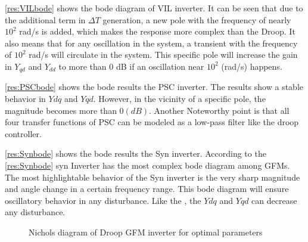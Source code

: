 \ref{res:VILbode} shows the bode diagram of \gls{VIL} inverter. It can be seen that due to the additional term in $\Delta T$ generation, a new pole with the frequency of nearly $10^2$ rad/s is added, which makes the response more complex than the Droop. It also means that for any oscillation in the system, a transient with the frequency of $10^2$ rad/s will circulate in the system. This specific pole will increase the gain in $Y_{qd}$ and $Y_{dd}$ to more than $0$ dB if an oscillation near $10^2$ (rad/s) happens.


\ref{res:PSCbode} shows the bode results the \gls{PSC} inverter. The results show a stable behavior in $Ydq$ and $Yqd$. However, in the vicinity of a specific pole, the magnitude becomes more than $0 (dB)$. Another Noteworthy point is that all four transfer functions of PSC can be modeled as a low-pass filter like the droop controller.


\ref{res:Synbode} shows the bode results the \gls{Syn} inverter. According to the \ref{res:Synbode} \gls{syn} Inverter has the most complex bode diagram among GFMs. The most highlightable behavior of the \gls{Syn} inverter is the very sharp magnitude and angle change in a certain frequency range. This bode diagram will ensure oscillatory behavior in any disturbance. Like the , the $Ydq$ and $Yqd$ can decrease any disturbance.

\begin{figure}[ht]
    \centering
     \nonindent
	\caption[Nichols diagram of Droop GFM  inverter]{Nichols diagram of Droop GFM  inverter for optimal parameters}
	\label{res:DroopNichols}
\end{figure}

